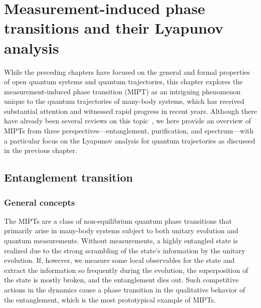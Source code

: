 \documentclass[preprint,pteplogo]{ptephy_v2}%
\numberwithin{equation}{section}
\theoremstyle{definition}
\begin{document}

\section{Measurement-induced phase transitions and their Lyapunov analysis}
\label{sec:mipt}
While the preceding chapters have focused on the general and formal properties of open quantum systems and quantum trajectories, this chapter explores the measurement-induced phase transition (MIPT) as an intriguing phenomenon unique to the quantum trajectories of many-body systems, which has received substantial attention and witnessed rapid progress in recent years.
Although there have already been several reviews on this topic~\cite{Potter2022, fisher2023random, Lunt2022Quantum, Skinner23lecture, HanZeLi2025Measurement}, we here provide an overview of MIPTs from three perspectives—entanglement, purification, and spectrum—with a particular focus on the Lyapunov analysis for quantum trajectories as discussed in the previous chapter.

\subsection{Entanglement transition}
\label{sec:entanglement_MIPT}
\subsubsection{General concepts}
The MIPTs are a class of non-equilibrium quantum phase transitions that primarily arise in many-body systems subject to both unitary evolution and quantum measurements.
Without measurements, a highly entangled state is realized due to the strong scrambling of the state's information by the unitary evolution.
If, however, we measure some local observables for the state and extract the information so frequently during the evolution, the superposition of the state is mostly broken, and the entanglement dies out.
Such competitive actions in the dynamics cause a phase transition in the qualitative behavior of the entanglement, which is the most prototypical example of MIPTs.
\end{document}

